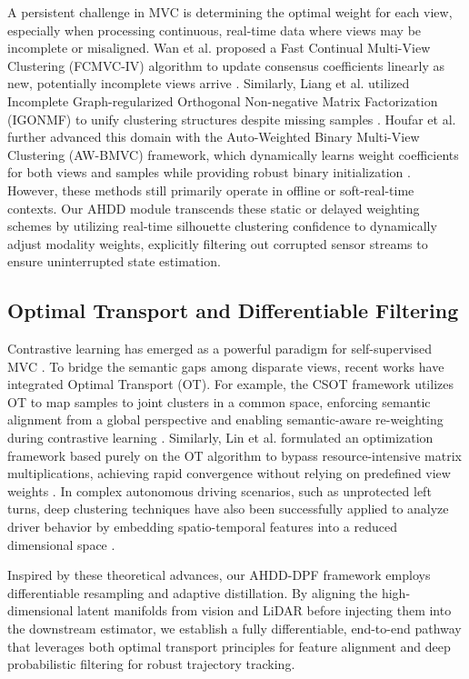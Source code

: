 \documentclass[final,3p,times]{elsarticle}
\begin{document}
A persistent challenge in MVC is determining the optimal weight for each view, especially when processing continuous, real-time data where views may be incomplete or misaligned. Wan et al. proposed a Fast Continual Multi-View Clustering (FCMVC-IV) algorithm to update consensus coefficients linearly as new, potentially incomplete views arrive \cite{wan2023fast}. Similarly, Liang et al. utilized Incomplete Graph-regularized Orthogonal Non-negative Matrix Factorization (IGONMF) to unify clustering structures despite missing samples \cite{liang2022incomplete}. Houfar et al. further advanced this domain with the Auto-Weighted Binary Multi-View Clustering (AW-BMVC) framework, which dynamically learns weight coefficients for both views and samples while providing robust binary initialization \cite{houfar2023automatically}. However, these methods still primarily operate in offline or soft-real-time contexts. Our AHDD module transcends these static or delayed weighting schemes by utilizing real-time silhouette clustering confidence to dynamically adjust modality weights, explicitly filtering out corrupted sensor streams to ensure uninterrupted state estimation.

\subsection{Optimal Transport and Differentiable Filtering}
Contrastive learning has emerged as a powerful paradigm for self-supervised MVC \cite{chowdhury2025deep}. To bridge the semantic gaps among disparate views, recent works have integrated Optimal Transport (OT). For example, the CSOT framework utilizes OT to map samples to joint clusters in a common space, enforcing semantic alignment from a global perspective and enabling semantic-aware re-weighting during contrastive learning \cite{zhang2024learning}. Similarly, Lin et al. formulated an optimization framework based purely on the OT algorithm to bypass resource-intensive matrix multiplications, achieving rapid convergence without relying on predefined view weights \cite{lin2023multi}. In complex autonomous driving scenarios, such as unprotected left turns, deep clustering techniques have also been successfully applied to analyze driver behavior by embedding spatio-temporal features into a reduced dimensional space \cite{shen2023analysis}.

Inspired by these theoretical advances, our AHDD-DPF framework employs differentiable resampling and adaptive distillation. By aligning the high-dimensional latent manifolds from vision and LiDAR before injecting them into the downstream estimator, we establish a fully differentiable, end-to-end pathway that leverages both optimal transport principles for feature alignment and deep probabilistic filtering for robust trajectory tracking.
\end{document}

